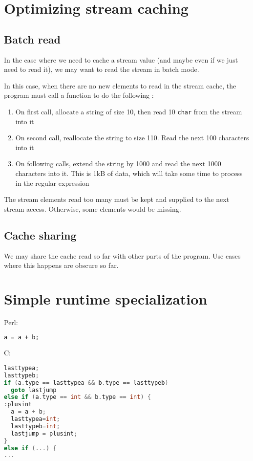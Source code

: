 \documentclass[11pt,a4paper]{report}
\newcommand{\ccode}[1]{\texttt{#1}}
\begin{document}
\section{Optimizing stream caching}
\label{streamcachingopt}

\subsection{Batch read}

In the case where we need to cache a stream value (and maybe even if we just need to read it), we may want to read the stream in batch mode.

In this case, when there are no new elements to read in the stream cache, the program must call a function to do the following :
\begin{enumerate}
\item On first call, allocate a string of size 10, then read 10 \ccode{char} from the stream into it
\item On second call, reallocate the string to size 110. Read the next 100 characters into it
\item On following calls, extend the string by 1000 and read the next 1000 characters into it. This is 1kB of data, which will take some time to process in the regular expression
\end{enumerate}

The stream elements read too many must be kept and supplied to the next stream access. Otherwise, some elements would be missing.

\subsection{Cache sharing}

We may share the cache read so far with other parts of the program. Use cases where this happens are obscure so far.

\section{Simple runtime specialization}


Perl:
\begin{lstlisting}[language=perl]
a = a + b;
\end{lstlisting}

C:
\begin{lstlisting}[language=C]
lasttypea;
lasttypeb;
if (a.type == lasttypea && b.type == lasttypeb)
  goto lastjump
else if (a.type == int && b.type == int) {
:plusint
  a = a + b;
  lasttypea=int;
  lasttypeb=int;
  lastjump = plusint;
}
else if (...) {	
...
\end{lstlisting}
\end{document}
